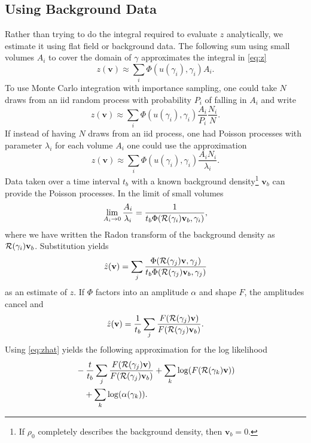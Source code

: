 \documentclass[twocolumn]{article}
\newcommand{\Radon}{{\cal R}}
\newcommand{\av}{\mathbf{v}}%
\begin{document}
\subsection{Using Background Data}
\label{sec:background}

Rather than trying to do the integral required to evaluate $z$
analytically, we estimate it using flat field or background data.
The following sum using small volumes $A_i$ to cover the domain of
$\gamma$ approximates the integral in \eqref{eq:z}
\begin{equation*}
  z(\av) \approx \sum_i \Phi(u(\gamma_i),\gamma_i) A_i.
\end{equation*}
To use Monte Carlo integration with importance sampling, one could
take $N$ draws from an iid random process with probability $P_i$ of
falling in $A_i$ and write
\begin{equation*}
   z(\av) \approx \sum_i \Phi(u(\gamma_i),\gamma_i)\frac{A_i}{P_i}
   \frac{N_i}{N}.
\end{equation*}
If instead of having $N$ draws from an iid process, one had Poisson
processes with parameter $\lambda_i$ for each volume $A_i$ one could
use the approximation
\begin{equation*}
   z(\av) \approx \sum_i \Phi(u(\gamma_i),\gamma_i)\frac{A_i N_i}
   {\lambda_i}.
\end{equation*}
Data taken over a time interval $t_b$ with a known background
density\footnote{If $\rho_0$ completely describes the background
  density, then $\av_b = 0$.}  $\av_b$ can provide the Poisson
processes.  In the limit of small volumes
\begin{align*}
  \lim_{A_i\rightarrow 0} \frac{A_i}{\lambda_i} =
  \frac{1}{t_b \Phi(\Radon(\gamma_i)\av_b,\gamma_i)},
\end{align*}
where we have written the Radon transform of the background density as
$\Radon(\gamma_i)\av_b$.  Substitution yields
\begin{equation*}
  \hat z(\av) = \sum_j \frac{\Phi(\Radon(\gamma_j)\av,\gamma_j)}
  {t_b\Phi(\Radon(\gamma_j)\av_b,\gamma_j)}
\end{equation*}
as an estimate of $z$.  If $\Phi$ factors into an amplitude $\alpha$
and shape $F$, the amplitudes cancel and
\begin{equation}
  \label{eq:zhat}
  \hat z(\av) = \frac{1}{t_b}\sum_j \frac{F(\Radon(\gamma_j)\av)}
  {F(\Radon(\gamma_j)\av_b)}.  
\end{equation}
Using \eqref{eq:zhat} yields the following approximation for the
log likelihood
\begin{align*}
  &-\frac{t}{t_b}\sum_j \frac{F(\Radon(\gamma_j)\av)}
  {F(\Radon(\gamma_j)\av_b)} + \sum_k \log(F(\Radon(\gamma_k)\av)) \\
  &\quad + \sum_k \log(\alpha(\gamma_k)).
\end{align*}
\end{document}

